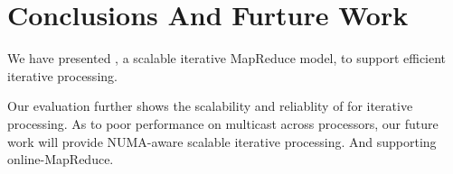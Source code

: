 \section{Conclusions And Furture Work}
\label{sec:concl}
We have presented \myds,
a scalable iterative MapReduce model, 
to support efficient iterative processing.

Our evaluation further shows the scalability and reliablity of \myds
for iterative processing.
As to poor performance on multicast across processors,
our future work will provide NUMA-aware scalable iterative processing.
And supporting online-MapReduce.
\iffalse
\section*{Acknowledgment} 
{\small
This work was supported in part by 
the National High Technology Research and Development Program
of China (863 Program) grant (No.2012AA010901),
and the National Natural Science Foundation of China Grant (No.61170018).}
\fi
